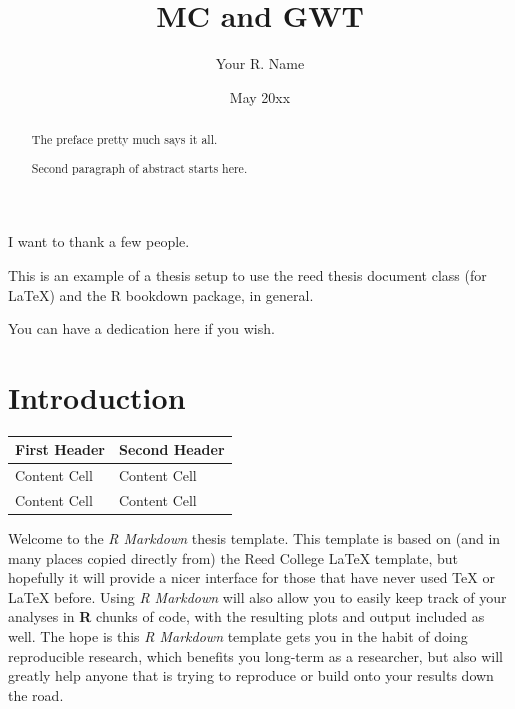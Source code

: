 \documentclass[12pt,twoside]{reedthesis}
\title{MC and GWT}
\author{Your R. Name}
\date{May 20xx}
\begin{document}
  \maketitle

\frontmatter %
\pagestyle{empty} %
  \begin{acknowledgements}
    I want to thank a few people.
  \end{acknowledgements}
  \begin{preface}
    This is an example of a thesis setup to use the reed thesis document class
    (for LaTeX) and the R bookdown package, in general.
  \end{preface}
  \hypersetup{linkcolor=black}
  \setcounter{tocdepth}{2}
  \tableofcontents

  \listoftables

  \listoffigures
  \begin{abstract}
    The preface pretty much says it all.
    
    \par
    
    Second paragraph of abstract starts here.
  \end{abstract}
  \begin{dedication}
    You can have a dedication here if you wish.
  \end{dedication}
\mainmatter %
\pagestyle{fancyplain} %

\hypertarget{introduction}{%
\chapter*{Introduction}\label{introduction}}
\begin{longtable}[]{@{}ll@{}}
\toprule
First Header & Second Header\tabularnewline
\midrule
\endhead
Content Cell & Content Cell\tabularnewline
Content Cell & Content Cell\tabularnewline
\bottomrule
\end{longtable}
Welcome to the \emph{R Markdown} thesis template. This template is based on (and in many places copied directly from) the Reed College LaTeX template, but hopefully it will provide a nicer interface for those that have never used TeX or LaTeX before. Using \emph{R Markdown} will also allow you to easily keep track of your analyses in \textbf{R} chunks of code, with the resulting plots and output included as well. The hope is this \emph{R Markdown} template gets you in the habit of doing reproducible research, which benefits you long-term as a researcher, but also will greatly help anyone that is trying to reproduce or build onto your results down the road.
\end{document}

